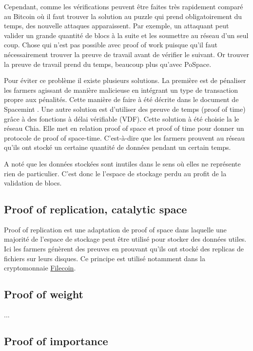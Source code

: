 Cependant, comme les vérifications peuvent être faites très rapidement comparé au Bitcoin où il faut trouver la solution au puzzle qui prend obligatoirement du temps, des nouvelle attaques apparaissent. Par exemple, un attaquant peut valider un grande quantité de blocs à la suite et les soumettre au réseau d'un seul coup. Chose qui n'est pas possible avec proof of work puisque qu'il faut nécessairement trouver la preuve de travail avant de vérifier le suivant. Or trouver la preuve de travail prend du temps, beaucoup plus qu'avec PoSpace. 

Pour éviter ce problème il existe plusieurs solutions. La première est de pénaliser les farmers agissant de manière malicieuse en intégrant un type de transaction propre aux pénalités. Cette manière de faire à été décrite dans le document de Spacemint \cite{DBLP:conf/fc/ParkKFGAP18}. Une autre solution est d'utiliser des preuve de temps (proof of time) grâce à des fonctions à délai vérifiable (VDF). Cette solution à été choisie la le réseau Chia. Elle met en relation proof of space et proof of time pour donner un protocole de proof of space-time. C'est-à-dire que les farmers prouvent au réseau qu'ils ont stocké un certaine quantité de données pendant un certain temps.

A noté que les données stockées sont inutiles dans le sens où elles ne représente rien de particulier. C'est donc le l'espace de stockage perdu au profit de la validation de blocs.

\subsection{Proof of replication, catalytic space}

Proof of replication est une adaptation de proof of space dans laquelle une majorité de l'espace de stockage peut être utilisé pour stocker des données utiles. Ici les farmers génèrent des preuves en prouvant qu'ils ont stocké des replicas de fichiers sur leurs disques. Ce principe est utilisé notamment dans la cryptomonnaie \href{https://filecoin.io/}{Filecoin}.

\subsection{Proof of weight}

...

\subsection{Proof of importance}

